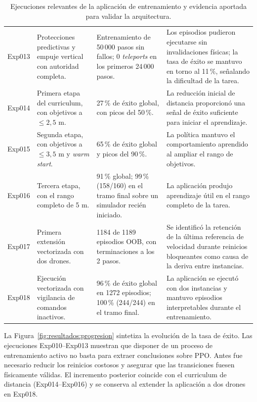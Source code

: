 \begin{table}[H]
\begin{tabular}{p{} p{} p{} p{}}
Exp013 & Protecciones predictivas y empuje vertical con autoridad completa. & Entrenamiento de 50\,000 pasos sin fallos; 0 \emph{teleports} en los primeros 24\,000 pasos. & Los episodios pudieron ejecutarse sin invalidaciones físicas; la tasa de éxito se mantuvo en torno al 11\,\%, señalando la dificultad de la tarea. \\
Exp014 & Primera etapa del curriculum, con objetivos a $\leq 2{,}5$ m. & 27\,\% de éxito global, con picos del 50\,\%. & La reducción inicial de distancia proporcionó una señal de éxito suficiente para iniciar el aprendizaje. \\
Exp015 & Segunda etapa, con objetivos a $\leq 3{,}5$ m y \emph{warm start}. & 65\,\% de éxito global y picos del 90\,\%. & La política mantuvo el comportamiento aprendido al ampliar el rango de objetivos. \\
Exp016 & Tercera etapa, con el rango completo de 5 m. & 91\,\% global; 99\,\% (158/160) en el tramo final sobre un simulador recién iniciado. & La aplicación produjo aprendizaje útil en el rango completo de la tarea. \\
Exp017 & Primera extensión vectorizada con dos drones. & 1184 de 1189 episodios OOB, con terminaciones a los 2 pasos. & Se identificó la retención de la última referencia de velocidad durante reinicios bloqueantes como causa de la deriva entre instancias. \\
Exp018 & Ejecución vectorizada con vigilancia de comandos inactivos. & 96\,\% de éxito global en 1272 episodios; 100\,\% (244/244) en el tramo final. & La aplicación se ejecutó con dos instancias y mantuvo episodios interpretables durante el entrenamiento. \\
\hline
\end{tabular}
\caption{Ejecuciones relevantes de la aplicación de entrenamiento y evidencia
aportada para validar la arquitectura.}
\label{tab:resultados:experimentos}
\end{table}

La Figura~\ref{fig:resultados:progresion} sintetiza la evolución de la tasa de
éxito. Las ejecuciones Exp010--Exp013 muestran que disponer de un proceso de
entrenamiento activo no basta para extraer conclusiones sobre PPO. Antes fue
necesario reducir los reinicios costosos y asegurar que las transiciones fuesen
físicamente válidas. El incremento posterior coincide con el curriculum de
distancia (Exp014--Exp016) y se conserva al extender la aplicación a dos drones
en Exp018.

